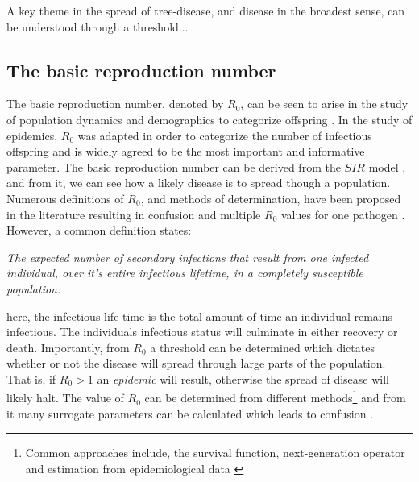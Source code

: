 A key theme in the spread of tree-disease, and disease in the broadest sense, can be understood through a threshold...
\blindtext

\subsection{The basic reproduction number}
The basic reproduction number, denoted by $R_0$, can be seen to arise in the study of population dynamics and demographics to categorize offspring \cite{heesterbeek2002brief}. In the study of epidemics, $R_0$ was adapted in order to categorize the number of infectious offspring and is widely agreed to be the most important and informative parameter. The basic reproduction number can be derived from the $SIR$ model \cite{kermack-model}, and from it, we can see how a likely disease is to spread though a population. Numerous definitions of $R_0$, and methods of determination, have been proposed in the literature resulting in confusion and multiple $R_0$ values for one pathogen \cite{delamater2019complexity}. However, a common definition states:

\textit{The expected number of secondary infections that result from one infected individual, over it's entire infectious lifetime, in a completely susceptible population.}

here, the infectious life-time is the total amount of time an individual remains infectious. The individuals infectious status will culminate in either recovery or death. Importantly, from $R_0$ a threshold can be determined which dictates whether or not the disease will spread through large parts of the population. That is, if $R_0>1$ an \textit{epidemic} will result, otherwise the spread of disease will likely halt. The value of $R_0$ can be determined from different methods\footnote{Common approaches include, the survival function, next-generation operator and estimation from epidemiological data \cite{perspectives-on-r0}} and from it many surrogate parameters can be calculated which leads to confusion \cite{diekmann2010construction}.


